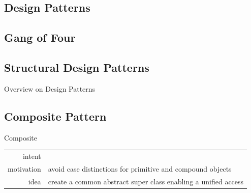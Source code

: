 \subsection{Design Patterns}
\slideDesignPatterns

\subsection{Gang of Four}
\slideGangOfFour

\subsection{Structural Design Patterns}
\begin{frame}[label=structuralpatterns]{Overview on Design Patterns \mytitlesource{\gof}}
	\centering{}
\end{frame}

\subsection{Composite Pattern}
\begin{frame}{\insertsubsection}
	\begin{fancycolumns}
		\begin{definition}{Composite \mysource{\gof}}
			\setlength\tabcolsep{1mm}
			\begin{tabularx}{\textwidth}{rX}
				intent     & \mycite{Compose objects into tree structures to represent part-whole hierarchies. Composite lets clients treat individual objects and compositions of objects uniformly.} \\
				motivation & avoid case distinctions for primitive and compound objects                                                                                                                \\
				idea       & create a common abstract super class enabling a unified access
			\end{tabularx}
		\end{definition}
		\nextcolumn
	\end{fancycolumns}
\end{frame}


